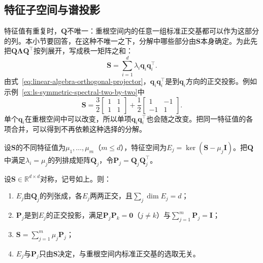 \subsection{特征子空间与谱投影}
\label{sec:ls-spectral-projections}

特征值有重复时，$\bm Q$不唯一：重根空间内的任意一组标准正交基都可以作为这部分的列。本小节要回答，在这种不唯一之下，分解中哪些部分由$\bm S$本身确定。为此先把$\bm Q\bm\Lambda\bm Q^\top$按列展开，写成秩一矩阵之和：
\[
 \bm S=\sum_{i=1}^d\lambda_i\bm q_i\bm q_i^\top .
\]
由式~\eqref{eq:linear-algebra-orthogonal-projector}，$\bm q_i\bm q_i^\top$是到$\bm q_i$方向的正交投影。例如示例~\ref{ex:ls-symmetric-spectral-two-by-two}中
\[
 \bm S=\frac32\begin{bmatrix}1&1\\1&1\end{bmatrix}+\frac12\begin{bmatrix}1&-1\\-1&1\end{bmatrix}.
\]
单个$\bm q_i$在重根空间中可以改变，所以单项$\bm q_i\bm q_i^\top$也会随之改变。把同一特征值的各项合并，可以得到不再依赖这种选择的分解。

设$\bm S$的不同特征值为$\mu_1,\ldots,\mu_m$（$m\leq d$），特征空间为$E_j=\ker(\bm S-\mu_j\bm I)$。把$\bm Q$中满足$\lambda_i=\mu_j$的列排成矩阵$\bm Q_j$，令$\bm P_j=\bm Q_j\bm Q_j^\top$。

\begin{theorem}[谱投影]
\label{thm:ls-spectral-projections}
设$\bm S\in\mathbb R^{d\times d}$对称，记号如上。则：
\begin{enumerate}
 \item $E_j$由$\bm Q_j$的列张成，各$E_j$两两正交，且$\sum_j\dim E_j=d$；
 \item $\bm P_j$是到$E_j$的正交投影，满足$\bm P_j\bm P_k=\bm0$（$j\neq k$）与$\sum_{j=1}^m\bm P_j=\bm I$；
 \item $\bm S=\sum_{j=1}^m\mu_j\bm P_j$；
 \item $E_j$与$\bm P_j$只由$\bm S$决定，与重根空间内标准正交基的选取无关。
\end{enumerate}
\end{theorem}

